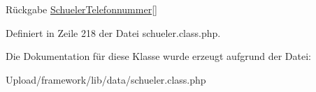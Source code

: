 \begin{DoxyReturn}{Rückgabe}
\mbox{\hyperlink{class_schueler_telefonnummer}{Schueler\+Telefonnummer}}\mbox{[}\mbox{]} 
\end{DoxyReturn}


Definiert in Zeile 218 der Datei schueler.\+class.\+php.



Die Dokumentation für diese Klasse wurde erzeugt aufgrund der Datei\+:\begin{DoxyCompactItemize}
\item 
Upload/framework/lib/data/schueler.\+class.\+php\end{DoxyCompactItemize}
